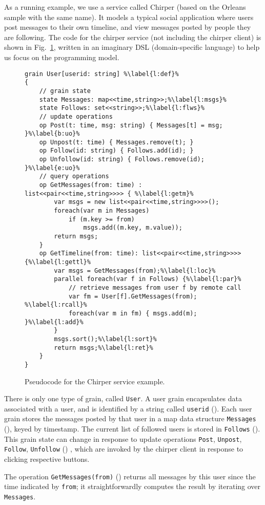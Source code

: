 As a running example, we use a service called Chirper (based on the Orleans sample with the same name). It models a typical social application where users post messages to their own timeline, and view messages posted by people they are following.
The code for the chirper service (not including the chirper client) is shown in Fig.~\ref{fig:chirper}, written in an imaginary DSL (domain-specific language) to help us focus on the programming model. 

\begin{figure}
\begin{lstlisting}
grain User[userid: string] %\label{l:def}%
{
	// grain state
	state Messages: map<<time,string>>;%\label{l:msgs}%
	state Follows: set<<string>>;%\label{l:flws}%
	// update operations
	op Post(t: time, msg: string) { Messages[t] = msg; }%\label{b:uo}%
	op Unpost(t: time) { Messages.remove(t); }
	op Follow(id: string) { Follows.add(id); }
	op Unfollow(id: string) { Follows.remove(id); }%\label{e:uo}%
	// query operations
	op GetMessages(from: time) : list<<pair<<time,string>>>> { %\label{l:getm}%
		var msgs = new list<<pair<<time,string>>>>();
		foreach(var m in Messages)
			if (m.key >= from)
				msgs.add((m.key, m.value));
		return msgs;
	}
	op GetTimeline(from: time): list<<pair<<time,string>>>> {%\label{l:gettl}%
		var msgs = GetMessages(from);%\label{l:loc}%
		parallel foreach(var f in Follows) {%\label{l:par}%
			// retrieve messages from user f by remote call
			var fm = User[f].GetMessages(from); %\label{l:rcall}%
			foreach(var m in fm) { msgs.add(m); }%\label{l:add}%
		}
		msgs.sort();%\label{l:sort}%
		return msgs;%\label{l:ret}%
	}
}
\end{lstlisting}
\caption{Pseudocode for the Chirper service example.}\label{fig:chirper}
\end{figure}

There is only one type of grain, called \lstinline|User|.  A user grain encapsulates data associated with a user, and is identified by a string called \lstinline{userid} (). Each user grain stores the messages posted by that user in a map data structure \lstinline|Messages| (), keyed by timestamp. The current list of followed users is stored in \lstinline|Follows| (). This grain state can change in response to update operations \lstinline|Post|, \lstinline|Unpost|, \lstinline|Follow|, \lstinline|Unfollow| () , which are invoked by the chirper client in response to clicking respective buttons.

The operation \lstinline|GetMessages(from)| () returns all messages by this user since the time indicated by \lstinline|from|; it straightforwardly computes the result by iterating over \lstinline{Messages}.  

